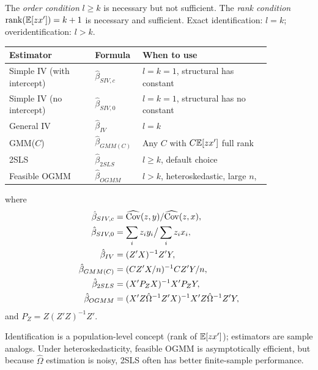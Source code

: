 \begin{remark}
	The \emph{order condition} $l\ge k$ is necessary but not sufficient. The \emph{rank condition} $\operatorname{rank}(\mathbb{E}[zx'])=k+1$ is necessary and sufficient. Exact identification: $l=k$; overidentification: $l>k$.
\end{remark}

\begin{remark}
	\begin{center}
		\small
		\renewcommand{\arraystretch}{1.1}
		\begin{tabular}{p{0.30\linewidth}p{0.10\linewidth}p{0.45\linewidth}}
			\toprule
			Estimator & Formula & When to use \\
			\midrule
			Simple IV (with intercept) & $\hat{\beta}_{SIV,c}$ & $l=k=1$, structural has constant \\
			Simple IV (no intercept) & $\hat{\beta}_{SIV,0}$ & $l=k=1$, structural has no constant \\
			General IV & $\hat{\beta}_{IV}$ & $l=k$ \\
			GMM($C$) & $\hat{\beta}_{GMM(C)}$ & Any $C$ with $C\mathbb{E}[zx']$ full rank \\
			2SLS & $\hat{\beta}_{2SLS}$ & $l\ge k$, default choice \\
			Feasible OGMM & $\hat{\beta}_{OGMM}$ & $l>k$, heteroskedastic, large $n$, \\
			\bottomrule
		\end{tabular}
		\end{center}
		where
		\begin{align*}
			\hat{\beta}_{SIV,c} &= \widehat{\operatorname{Cov}}(z,y)/\widehat{\operatorname{Cov}}(z,x), \\
			\hat{\beta}_{SIV,0} &= \sum_i z_i y_i\big/\sum_i z_i x_i, \\
			\hat{\beta}_{IV} &= (Z'X)^{-1}Z'Y, \\
			\hat{\beta}_{GMM(C)} &= (CZ'X/n)^{-1}CZ'Y/n, \\
			\hat{\beta}_{2SLS} &= (X'P_ZX)^{-1}X'P_ZY, \\
			\hat{\beta}_{OGMM} &= (X'Z\hat{\Omega}^{-1}Z'X)^{-1}X'Z\hat{\Omega}^{-1}Z'Y,
		\end{align*}
		and $P_Z = Z(Z'Z)^{-1}Z'$.
\end{remark}

\begin{remark}
	Identification is a population-level concept (rank of $\mathbb{E}[zx']$); estimators are sample analogs. Under heteroskedasticity, feasible OGMM is asymptotically efficient, but because $\hat{\Omega}$ estimation is noisy, 2SLS often has better finite-sample performance.
\end{remark}

